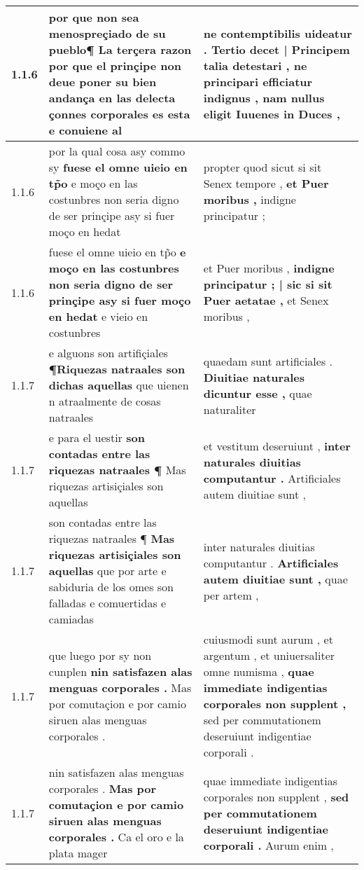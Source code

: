 \begin{tabular}{|p{1cm}|p{6.5cm}|p{6.5cm}|}
1.1.6 & por que non sea menospreçiado de su pueblo¶ \textbf{ La terçera razon por que el prinçipe non deue poner su bien andança en las delecta çonnes corporales es esta } e conuiene al & ne contemptibilis uideatur . \textbf{ Tertio decet | Principem talia detestari , ne principari efficiatur indignus , } nam nullus eligit Iuuenes in Duces , \\\hline
1.1.6 & por la qual cosa asy commo sy \textbf{ fuese el omne uieio en tp̃o } e moço en las costunbres non seria digno de ser prinçipe asy si fuer moço en hedat & propter quod sicut si sit Senex tempore , \textbf{ et Puer moribus , } indigne principatur ; \\\hline
1.1.6 & fuese el omne uieio en tp̃o \textbf{ e moço en las costunbres non seria digno de ser prinçipe asy si fuer moço en hedat } e vieio en costunbres & et Puer moribus , \textbf{ indigne principatur ; | sic si sit Puer aetatae , } et Senex moribus , \\\hline
1.1.7 & e alguons son artifiçiales \textbf{ ¶Riquezas natraales son dichas aquellas } que uienen n atraalmente de cosas natraales & quaedam sunt artificiales . \textbf{ Diuitiae naturales dicuntur esse , } quae naturaliter \\\hline
1.1.7 & e para el uestir \textbf{ son contadas entre las riquezas natraales ¶ } Mas riquezas artisiçiales son aquellas & et vestitum deseruiunt , \textbf{ inter naturales diuitias computantur . } Artificiales autem diuitiae sunt , \\\hline
1.1.7 & son contadas entre las riquezas natraales ¶ \textbf{ Mas riquezas artisiçiales son aquellas } que por arte e sabiduria de los omes son falladas e comuertidas e camiadas & inter naturales diuitias computantur . \textbf{ Artificiales autem diuitiae sunt , } quae per artem , \\\hline
1.1.7 & que luego por sy non cunplen \textbf{ nin satisfazen alas menguas corporales . } Mas por comutaçion e por camio siruen alas menguas corporales . & cuiusmodi sunt aurum , et argentum , et uniuersaliter omne numisma , \textbf{ quae immediate indigentias corporales non supplent , } sed per commutationem deseruiunt indigentiae corporali . \\\hline
1.1.7 & nin satisfazen alas menguas corporales . \textbf{ Mas por comutaçion e por camio siruen alas menguas corporales . } Ca el oro e la plata mager & quae immediate indigentias corporales non supplent , \textbf{ sed per commutationem deseruiunt indigentiae corporali . } Aurum enim , \\\hline

\end{tabular}

